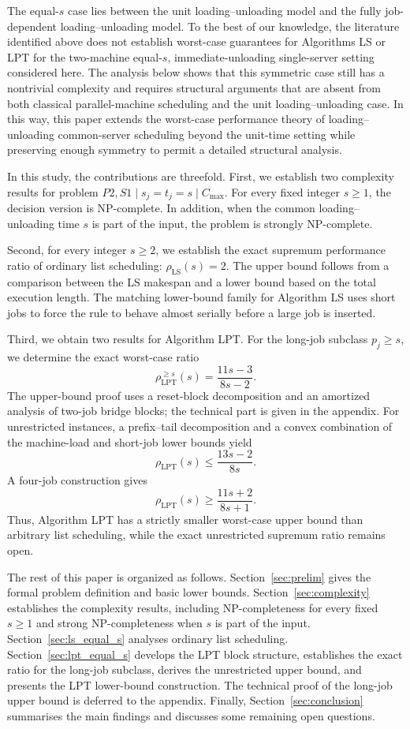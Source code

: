 \documentclass[11pt]{article}
\begin{document}
The equal-\(s\) case lies between the unit loading--unloading model and the fully
job-dependent loading--unloading model. To the best of our knowledge, the literature
identified above does not establish worst-case guarantees for Algorithms LS or LPT  for the
two-machine equal-\(s\), immediate-unloading single-server setting considered here.
The analysis below shows that this symmetric case still has a nontrivial complexity
and requires structural arguments that are absent from both classical
parallel-machine scheduling and the unit loading--unloading case. In this way, this 
paper extends the worst-case performance theory of loading--unloading
common-server scheduling beyond the unit-time setting while preserving enough
symmetry to permit a detailed structural analysis.

In this study, the contributions are threefold. First, we establish two complexity
results for problem \(P2,S1\mid s_j=t_j=s\mid C_{\max}\). For every fixed integer
\(s\ge1\), the decision version is NP-complete. In addition,
when the common loading--unloading time \(s\) is part of the input, the problem is
strongly NP-complete.

Second, for every integer \(s\ge2\), we establish the exact supremum performance
ratio of ordinary list scheduling: \(\rho_{\mathrm{LS}}(s)=2\). The upper bound follows from a comparison between the LS makespan and a lower
bound based on the total execution length. The matching lower-bound family for Algorithm LS
uses short jobs to force the rule to behave almost serially before a large job is
inserted.

Third, we obtain two results for Algorithm LPT. For the long-job subclass
\(p_j\ge s\), we determine the exact worst-case ratio
\[
\rho_{\mathrm{LPT}}^{\ge s}(s)=\frac{11s-3}{8s-2}.
\]
The upper-bound proof uses a reset-block decomposition and an amortized analysis of
two-job bridge blocks; the technical part is given in the appendix. For unrestricted
instances, a prefix--tail decomposition and a convex combination of the machine-load
and short-job lower bounds yield
\[
\rho_{\mathrm{LPT}}(s)\le\frac{13s-2}{8s}.
\]
A four-job construction gives
\[
\rho_{\mathrm{LPT}}(s)\ge\frac{11s+2}{8s+1}.
\]
Thus, Algorithm  LPT has a strictly smaller worst-case upper bound than arbitrary list
scheduling, while the exact unrestricted supremum ratio remains open.

The rest of this paper is organized as follows.
Section~\ref{sec:prelim} gives the formal problem definition and basic lower
bounds. Section~\ref{sec:complexity} establishes the complexity results, including
NP-completeness for every fixed \(s\ge1\) and strong NP-completeness when
\(s\) is part of the input. Section~\ref{sec:ls_equal_s} analyses ordinary list
scheduling. Section~\ref{sec:lpt_equal_s} develops the LPT block structure, establishes the
exact ratio for the long-job subclass, derives the unrestricted upper bound, and
presents the LPT lower-bound construction. The technical proof of the long-job
upper bound is deferred to the appendix.
Finally, Section~\ref{sec:conclusion} summarises the main findings and discusses
some remaining open questions.
\end{document}
